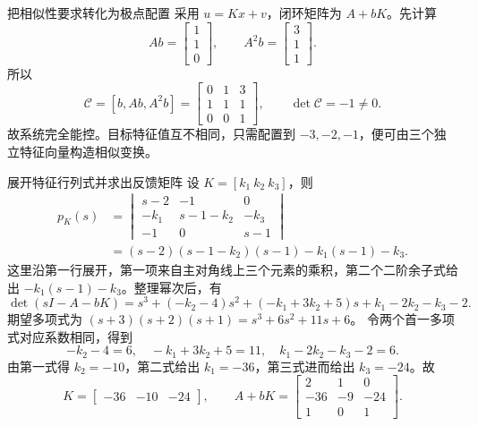 \documentclass[11pt]{article}
\begin{document}
\begin{solution}
\begin{proofstep}{把相似性要求转化为极点配置}
采用 $u=Kx+v$，闭环矩阵为 $A+bK$。先计算
\[
Ab=\begin{bmatrix}1\\1\\0\end{bmatrix},\qquad
A^2b=\begin{bmatrix}3\\1\\1\end{bmatrix}.
\]
所以
\[
\mathcal C=[b,Ab,A^2b]
=\begin{bmatrix}0&1&3\\1&1&1\\0&0&1\end{bmatrix},\qquad
\det\mathcal C=-1\ne0.
\]
故系统完全能控。目标特征值互不相同，只需配置到 $-3,-2,-1$，便可由三个独立特征向量构造相似变换。
\end{proofstep}

\pagebreak
\begin{proofstep}{展开特征行列式并求出反馈矩阵}
设 $K=[k_1\ k_2\ k_3]$，则
\begin{align*}
p_K(s)&=\begin{vmatrix}s-2&-1&0\\-k_1&s-1-k_2&-k_3\\-1&0&s-1\end{vmatrix}\\
&=(s-2)(s-1-k_2)(s-1)-k_1(s-1)-k_3.
\end{align*}
这里沿第一行展开，第一项来自主对角线上三个元素的乘积，第二个二阶余子式给出
$-k_1(s-1)-k_3$。整理幂次后，有
\[
\det(sI-A-bK)
=s^3+(-k_2-4)s^2+(-k_1+3k_2+5)s+k_1-2k_2-k_3-2.
\]
期望多项式为 $(s+3)(s+2)(s+1)=s^3+6s^2+11s+6$。
令两个首一多项式对应系数相同，得到
\[
-k_2-4=6,\quad -k_1+3k_2+5=11,\quad k_1-2k_2-k_3-2=6.
\]
由第一式得 $k_2=-10$，第二式给出 $k_1=-36$，第三式进而给出 $k_3=-24$。故
\[
\boxed{K=\begin{bmatrix}-36&-10&-24\end{bmatrix}},\qquad
A+bK=\begin{bmatrix}2&1&0\\-36&-9&-24\\1&0&1\end{bmatrix}.
\]
\end{proofstep}


\end{solution}
\end{document}
